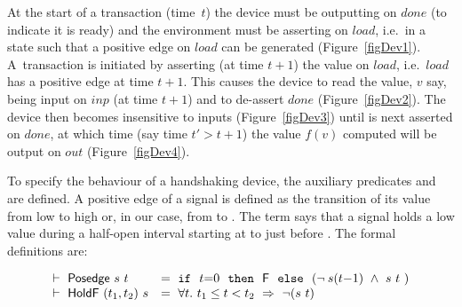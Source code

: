 \documentclass{llncs}
\begin{document}
At the start of a transaction (time~$t$) the device must be outputting
 on $done$ (to indicate it is ready) and the environment must
be asserting  on $load$, i.e.~in a state such that a positive
edge on $load$ can be generated (Figure~\ref{figDev1}).  A~transaction
is initiated by asserting (at time $t{+}1$) the value  on
$load$, i.e.~$load$ has a positive edge at time $t{+}1$. This causes
the device to read the value, $v$ say, being input on $inp$ (at time
$t{+}1$) and to de-assert $done$ (Figure~\ref{figDev2}).  The device
then becomes insensitive to inputs (Figure~\ref{figDev3}) until
 is next asserted on $done$, at which time (say time $t' >
t{+}1$) the value $f(v)$ computed will be output on $out$
(Figure~\ref{figDev4}).

To specify the behaviour of a handshaking device,
the auxiliary predicates  and  are defined.
A positive edge of a signal is defined as the transition of its
value from low to high or, in our case, from  to . 
The term  says that a
signal  holds a low value  during a half-open interval
starting at  to just before . The formal definitions are:

\vspace*{-1mm}

\[
\begin{array}{ll}
\vdash\ \mathsf{Posedge}\ s\ t~ &      = ~ \texttt{if}~~t{=}0~~\texttt{then}~~\mathsf{F}~~\texttt{else}~~(\neg\hspace*{0.8mm} s(t{-}1)\ \wedge\ s\ t~)\\
\vdash\ \mathsf{HoldF}\ (t_1,t_2)\ s & = ~ \forall t.\ t_1 \leq t < t_2\ \Rightarrow\ \neg(s\ t)
\end{array}
\]
\end{document}
